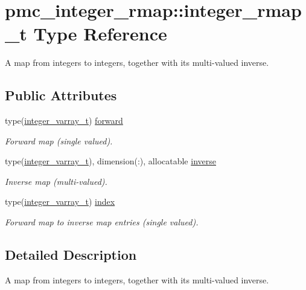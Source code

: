 \hypertarget{structpmc__integer__rmap_1_1integer__rmap__t}{}\section{pmc\+\_\+integer\+\_\+rmap\+:\+:integer\+\_\+rmap\+\_\+t Type Reference}
\label{structpmc__integer__rmap_1_1integer__rmap__t}


A map from integers to integers, together with its multi-\/valued inverse.  


\subsection*{Public Attributes}
\begin{DoxyCompactItemize}
\item 
type(\mbox{\hyperlink{structpmc__integer__varray_1_1integer__varray__t}{integer\+\_\+varray\+\_\+t}}) \mbox{\hyperlink{structpmc__integer__rmap_1_1integer__rmap__t_a1a1b17cd7c4ecab183cdc4d6ff4124bf}{forward}}
\begin{DoxyCompactList}\small\item\em Forward map (single valued). \end{DoxyCompactList}\item 
type(\mbox{\hyperlink{structpmc__integer__varray_1_1integer__varray__t}{integer\+\_\+varray\+\_\+t}}), dimension(\+:), allocatable \mbox{\hyperlink{structpmc__integer__rmap_1_1integer__rmap__t_ad3d3ed1f13dda7d95d31dc9b20011288}{inverse}}
\begin{DoxyCompactList}\small\item\em Inverse map (multi-\/valued). \end{DoxyCompactList}\item 
type(\mbox{\hyperlink{structpmc__integer__varray_1_1integer__varray__t}{integer\+\_\+varray\+\_\+t}}) \mbox{\hyperlink{structpmc__integer__rmap_1_1integer__rmap__t_a49514d00b7b652b8e4ab83e448259bb7}{index}}
\begin{DoxyCompactList}\small\item\em Forward map to inverse map entries (single valued). \end{DoxyCompactList}\end{DoxyCompactItemize}


\subsection{Detailed Description}
A map from integers to integers, together with its multi-\/valued inverse. 

